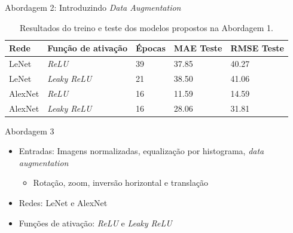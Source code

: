 \begin{frame}{Abordagem 2: Introduzindo \emph{Data Augmentation}}
  \begin{table}[!ht]
		\caption{Resultados do treino e teste dos modelos propostos na Abordagem 1.}
		\label{tab:results-1}
		\begin{center}
			\begin{tabular}{l l l l l}
				\toprule
				Rede & Função de ativação & Épocas & MAE Teste & RMSE Teste \\
				\midrule
        LeNet & \emph{ReLU}  & 39 & 37.85 & 40.27 \\
				LeNet & \emph{Leaky ReLU} & 21 & 38.50 & 41.06 \\
				AlexNet & \emph{ReLU}  & 16 & 11.59 & 14.59 \\
				AlexNet & \emph{Leaky ReLU} & 16 & 28.06 & 31.81 \\
				\bottomrule
			\end{tabular}
		\end{center}
	\end{table}
\end{frame}



\begin{frame}{Abordagem 3}
 \begin{itemize}
   \item Entradas: Imagens normalizadas, \alert{equalização por histograma}, \emph{data augmentation}
   \begin{itemize}
     \item Rotação, zoom, inversão horizontal e translação
   \end{itemize}
   \item Redes: LeNet e AlexNet
   \item Funções de ativação: \emph{ReLU} e \emph{Leaky ReLU}
   \end{itemize}
\end{frame}

